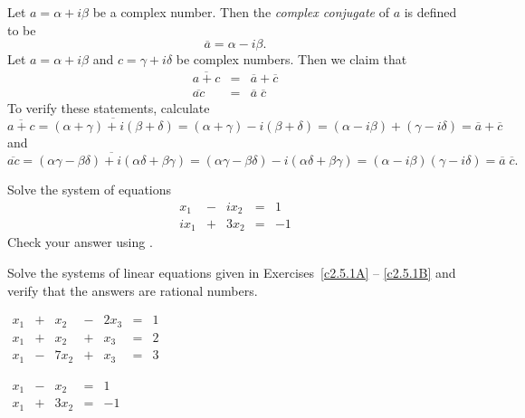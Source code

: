 Let $a=\alpha+i\beta$ be a complex number.  Then the {\em complex
conjugate\/}  of $a$ is defined to be
\[
\overline{a} = \alpha - i\beta.
\]
Let $a=\alpha+i\beta$ and $c=\gamma+i\delta$ be complex numbers.  Then we
claim that
\begin{equation}
\begin{array}{rcl}
\overline{a+c} & = & \overline{a} + \overline{c}\\
\overline{ac}  & = & \overline{a}\;\overline{c}
\end{array}
\end{equation}
To verify these statements, calculate
\[
\overline{a+c} = \overline{(\alpha+\gamma)+i(\beta+\delta)} =
(\alpha+\gamma)-i(\beta+\delta)= (\alpha-i\beta) + (\gamma-i\delta)
= \overline{a} + \overline{c}
\]
and
\[
\overline{ac} =
\overline{(\alpha\gamma-\beta\delta)+i(\alpha\delta+\beta\gamma)}
= (\alpha\gamma-\beta\delta)-i(\alpha\delta+\beta\gamma)
= (\alpha-i\beta)(\gamma-i\delta)=\overline{a}\;\overline{c}.
\]

\EXER

\TEXER

\begin{exercise} \label{c2.5.1}
Solve the system of equations
\[
\begin{array}{rcrcr}
 x_1 & - & ix_2 & = &  1\\
ix_1 & + & 3x_2 & = & -1
\end{array}
\]
Check your answer using \Matlabp.
\end{exercise}

\noindent Solve the systems of linear equations given in Exercises~\ref{c2.5.1A}
-- \ref{c2.5.1B} and verify that the answers are rational numbers. 
\begin{exercise} \label{c2.5.1A}
\qquad $\begin{array}{rcrcrcr}
         x_1 & + &   x_2 & - &   2x_3 & = & 1 \\
         x_1 & + &   x_2 & + &    x_3 & = & 2 \\
         x_1 & - &  7x_2 & + &    x_3 & = & 3
\end{array}$
\end{exercise}
\begin{exercise} \label{c2.5.1B}
\qquad $\begin{array}{rcrcr}
 x_1 & - &  x_2 & = &  1\\
 x_1 & + & 3x_2 & = & -1
\end{array}$
\end{exercise}

